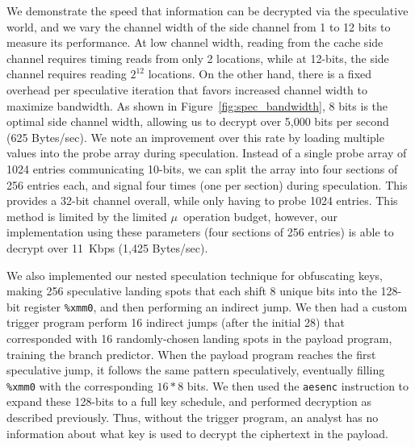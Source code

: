 We demonstrate the speed that information can be decrypted via the speculative
world, and we vary the channel width of the side channel from 1 to 12 bits to
measure its performance. At low channel width, reading from the cache side
channel requires timing reads from only 2 locations, while at 12-bits, the side
channel requires reading $2^{12}$ locations. On the other hand, there is a fixed
overhead per speculative iteration that favors increased channel width to
maximize bandwidth. As shown in Figure~\ref{fig:spec_bandwidth}, 8 bits is the
optimal side channel width, allowing us to decrypt over 5,000 bits per second
(625 Bytes/sec). We note an improvement over this rate by loading multiple
values into the probe array during speculation. Instead of a single
probe array of 1024 entries communicating 10-bits, we can split the array into
four sections of 256 entries each, and signal four times (one per section) during
speculation. This provides a 32-bit channel overall, while only having to probe
1024 entries. This method is limited by the limited $\mu$~operation budget,
however, our implementation using these parameters (four sections of 256
entries) is able to decrypt over 11~Kbps (1,425 Bytes/sec).



\smallskip

We also implemented our nested speculation technique for obfuscating keys,
making 256 speculative landing spots that each shift 8 unique bits into the
128-bit register \texttt{\%xmm0}, and then performing an indirect jump. We then
had a custom trigger program perform 16 indirect jumps (after the initial 28)
that corresponded with 16 randomly-chosen landing spots in the payload program,
training the branch predictor. When the payload program reaches the first
speculative jump, it follows the same pattern speculatively, eventually filling
\texttt{\%xmm0} with the corresponding $16*8$ bits. We then used the
\texttt{aesenc} instruction to expand these 128-bits to a full key schedule, and
performed decryption as described previously. Thus, without the trigger program,
an analyst has no information about what key is used to decrypt the ciphertext
in the payload.





